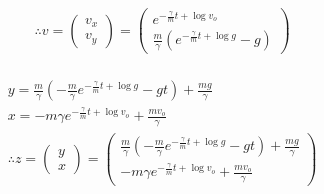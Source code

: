\documentclass[dvipdfmx,uplatex]{jsarticle}
\begin{document}
  \begin{equation}
    \begin{aligned}
      &\therefore v=\begin{pmatrix} {v}_{x} \\ {v}_{y} \end{pmatrix} = \begin{pmatrix} e^{-\frac{\gamma}{m}t + \log {v}_{o}} \\ \frac{m}{\gamma} \left( e^{-\frac{\gamma}{m}t + \log g} -g \right) \end{pmatrix} \nonumber\\
    \end{aligned}
  \end{equation}

  \newpage
  \begin{equation}
    \begin{aligned}
      &y = \frac{m}{\gamma}\left( -\frac{m}{\gamma}e^{-\frac{\gamma}{m}t + \log g} -gt \right) + \frac{mg}{\gamma}\nonumber\\
      &x = -{m}{\gamma}e^{-\frac{\gamma}{m}t + \log {v}_{o}} + \frac{m{v}_{o}}{\gamma}\nonumber\\
      &\therefore z = \begin{pmatrix} y \\ x \end{pmatrix} = \begin{pmatrix} \frac{m}{\gamma}\left( -\frac{m}{\gamma}e^{-\frac{\gamma}{m}t + \log g} -gt \right) + \frac{mg}{\gamma} \\  -{m}{\gamma}e^{-\frac{\gamma}{m}t + \log {v}_{o}} + \frac{m{v}_{o}}{\gamma} \end{pmatrix}\nonumber\\
    \end{aligned}
  \end{equation}
\end{document}
